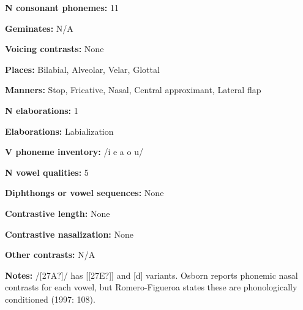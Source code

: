 \begin{styleBody}
\textbf{N consonant phonemes:} 11
\end{styleBody}

\begin{styleBody}
\textbf{Geminates:} N/A
\end{styleBody}

\begin{styleBody}
\textbf{Voicing contrasts:} None
\end{styleBody}

\begin{styleBody}
\textbf{Places:} Bilabial, Alveolar, Velar, Glottal
\end{styleBody}

\begin{styleBody}
\textbf{Manners:} Stop, Fricative, Nasal, Central approximant, Lateral flap
\end{styleBody}

\begin{styleBody}
\textbf{N elaborations:} 1
\end{styleBody}

\begin{styleBody}
\textbf{Elaborations:} Labialization
\end{styleBody}

\begin{styleBody}
\textbf{V phoneme inventory:} /i e a o u/
\end{styleBody}

\begin{styleBody}
\textbf{N vowel qualities:} 5
\end{styleBody}

\begin{styleBody}
\textbf{Diphthongs or vowel sequences:} None
\end{styleBody}

\begin{styleBody}
\textbf{Contrastive length: }None
\end{styleBody}

\begin{styleBody}
\textbf{Contrastive nasalization:} None
\end{styleBody}

\begin{styleBody}
\textbf{Other contrasts:} N/A
\end{styleBody}

\begin{styleBody}
\textbf{Notes:} /[27A?]/ has [[27E?]] and [d] variants. Osborn reports phonemic nasal contrasts for each vowel, but Romero-Figueroa states these are phonologically conditioned (1997: 108).
\end{styleBody}

